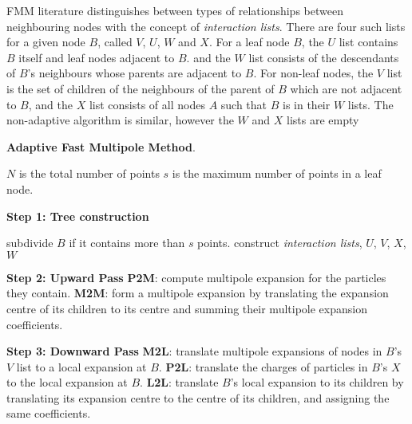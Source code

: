 FMM literature distinguishes between types of relationships  between neighbouring nodes with the concept of \textit{interaction lists}. There are four such lists for a given node $B$, called $V$, $U$, $W$ and $X$. For a leaf node $B$, the $U$ list contains $B$ itself and leaf nodes adjacent to $B$. and the $W$ list consists of the descendants of $B$'s neighbours whose parents are adjacent to $B$. For non-leaf nodes, the $V$ list is the set of children of the neighbours of the parent of $B$ which are not adjacent to $B$, and the $X$ list consists of all nodes $A$ such that $B$ is in their $W$ lists. The non-adaptive algorithm is similar, however the $W$ and $X$ lists are empty

\begin{algorithm}
    \caption{\textbf{Adaptive Fast Multipole Method}.}
    \label{alg:fmm}
    \begin{algorithmic}

        \STATE $N$ is the total number of points
        \STATE $s$ is the maximum number of points in a leaf node.

        \STATE
        \STATE \textbf{Step 1: Tree construction}

            \STATE subdivide $B$ if it contains more than $s$ points.
        \ENDFOR
            \STATE construct \textit{interaction lists}, $U$, $V$, $X$, $W$
        \ENDFOR

        \STATE
        \STATE \textbf{Step 2: Upward Pass}
        \STATE \textbf{P2M}: compute multipole expansion for the particles they contain.
        \ENDFOR
        \STATE \textbf{M2M}: form a multipole expansion by translating the expansion centre of its children to its centre and summing their multipole expansion coefficients.
        \ENDFOR

        \STATE
        \STATE \textbf{Step 3: Downward Pass}
        \STATE \textbf{M2L}: translate multipole expansions of nodes in $B$'s $V$ list to a local expansion at $B$.
        \STATE \textbf{P2L}: translate the charges of particles in $B$'s $X$ to the local expansion at $B$.
        \STATE \textbf{L2L}: translate $B$'s local expansion to its children by translating its expansion centre to the centre of its children, and assigning the same coefficients.
        \ENDFOR


\end{algorithmic}
\end{algorithm}
